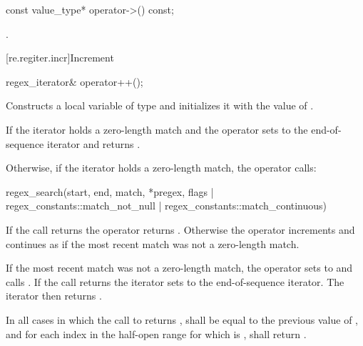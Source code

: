 %
\begin{itemdecl}
const value_type* operator->() const;
\end{itemdecl}

\begin{itemdescr}
\pnum
\returns
{}.
\end{itemdescr}

[re.regiter.incr]{Increment}

%
%
\begin{itemdecl}
regex_iterator& operator++();
\end{itemdecl}

\begin{itemdescr}
\pnum
\effects
Constructs a local variable  of type  and
initializes it with the value of .

\pnum
If the iterator holds a zero-length match and  the operator
sets  to the end-of-sequence iterator and returns .

\pnum
{}%
%
Otherwise, if the iterator holds a zero-length match, the operator calls:
\begin{codeblock}
regex_search(start, end, match, *pregex,
             flags | regex_constants::match_not_null | regex_constants::match_continuous)
\end{codeblock}
If the call returns  the operator
returns . Otherwise the operator increments  and continues as if
the most recent match was not a zero-length match.

\pnum
{}%
If the most recent match was not a zero-length match, the operator sets
 to  and
calls . If the call returns
 the iterator sets  to the end-of-sequence iterator. The
iterator then returns .

\pnum
In all cases in which the call to  returns ,
 shall be equal to the previous value of
, and for each index  in the half-open range
 for which  is ,
shall return .


\end{itemdescr}
